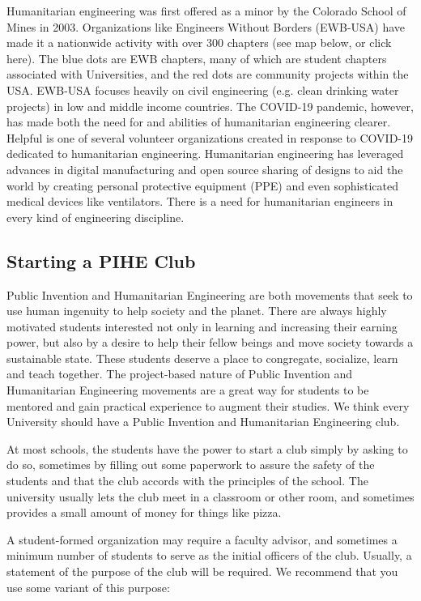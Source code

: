 \documentclass[
	fontsize=10pt, %
	twoside=false, %
	secnumdepth=1, %
]{kaobook}
\begin{document}
Humanitarian engineering was first offered as a minor by the Colorado School of Mines in 2003. Organizations like Engineers Without Borders (EWB-USA) have made it a nationwide activity with over 300 chapters (see map below, or click here). The blue dots are EWB chapters, many of which are student chapters associated with Universities, and the red dots are community projects within the USA. EWB-USA focuses heavily on civil engineering (e.g. clean drinking water projects) in low and middle income countries. The COVID-19 pandemic, however, has made both the need for and abilities of humanitarian engineering clearer. Helpful is one of several volunteer organizations created in response to COVID-19 dedicated to humanitarian engineering. Humanitarian engineering has leveraged advances in digital manufacturing and open source sharing of designs to aid the world by creating personal protective equipment (PPE) and even sophisticated medical devices like ventilators. There is a need for humanitarian engineers in every kind of engineering discipline.

\subsection{Starting a PIHE Club}

Public Invention and Humanitarian Engineering are both movements that seek to use human ingenuity to help society and the planet. There are always highly motivated students interested not only in learning and increasing their earning power, but also by a desire to help their fellow beings and move society towards a sustainable state. These students deserve a place to congregate, socialize, learn and teach together. The project-based nature of Public Invention and Humanitarian Engineering movements are a great way for students to be mentored and gain practical experience to augment their studies. We think every University should have a Public Invention and Humanitarian Engineering club.

At most schools, the students have the power to start a club simply by asking to do so, sometimes by filling out some paperwork to assure the safety of the students and that the club accords with the principles of the school. The university usually lets the club meet in a classroom or other room, and sometimes provides a small amount of money for things like pizza.

A student-formed organization may require a faculty advisor, and sometimes a minimum number of students to serve as the initial officers of the club. Usually, a statement of the purpose of the club will be required. We recommend that you use some variant of this purpose:
\end{document}
